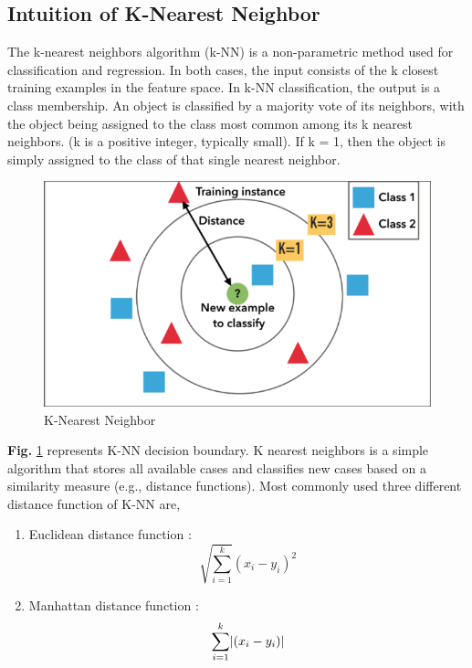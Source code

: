 \documentclass[12pt,a4paper]{report}
\DeclarePairedDelimiter{\abs}{\lvert}{\rvert}
\begin{document}
\subsection{Intuition of K-Nearest Neighbor}
The k-nearest neighbors algorithm (k-NN) is a non-parametric method used for classification and regression. In both cases, the input consists of the k closest training examples in the feature space. In k-NN classification, the output is a class membership. An object is classified by a majority vote of its neighbors, with the object being assigned to the class most common among its k nearest neighbors. (k is a positive integer, typically small). If k = 1, then the object is simply assigned to the class of that single nearest neighbor.
\begin{figure}[h!]
    \centering
    \includegraphics[scale=0.35]{Figures/knn.png}
    \caption{K-Nearest Neighbor}
    \label{fig:knn}
\end{figure}
\par
\noindent
\textbf{Fig.} \ref{fig:knn} represents K-NN decision boundary. K nearest neighbors is a simple algorithm that stores all available cases and classifies new cases based on a similarity measure (e.g., distance functions). Most commonly used three different distance function of K-NN are,

\begin{enumerate}
    \item Euclidean distance function :
    $$\sqrt{\sum_{i=1}^{k}}(x_i-y_i)^2$$
    \item Manhattan distance function :
    $$\sum_{i=1}^{k}\abs{(x_i-y_i)}$$
\end{enumerate}
\end{document}
